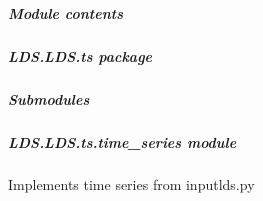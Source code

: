 \documentclass[letterpaper,10pt,english]{sphinxmanual}
\begin{document}
\subparagraph{Module contents}
\label{\detokenize{LDS.LDS.online_lds:module-LDS.LDS.online_lds}}\label{\detokenize{LDS.LDS.online_lds:module-contents}}

\subparagraph{LDS.LDS.ts package}
\label{\detokenize{LDS.LDS.ts:lds-lds-ts-package}}\label{\detokenize{LDS.LDS.ts::doc}}

\subparagraph{Submodules}
\label{\detokenize{LDS.LDS.ts:submodules}}

\subparagraph{LDS.LDS.ts.time\_series module}
\label{\detokenize{LDS.LDS.ts:module-LDS.LDS.ts.time_series}}\label{\detokenize{LDS.LDS.ts:lds-lds-ts-time-series-module}}
\sphinxAtStartPar
Implements time series from inputlds.py
\end{document}
